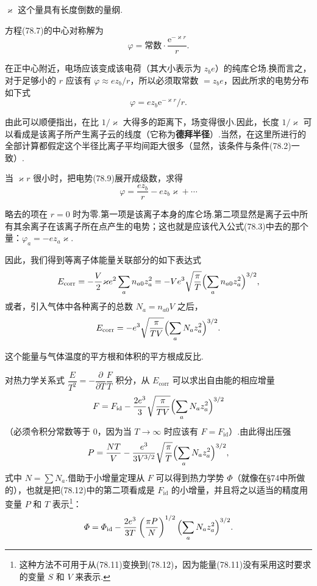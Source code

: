 $\varkappa$ 这个量具有长度倒数的量纲.

方程(78.7)的中心对称解为
\begin{equation*}
  \varphi=\text{常数}\cdot\frac{\mathrm{e}^{-\varkappa r}}{r}.
\end{equation*}

在正中心附近，电场应该变成该电荷（其大小表示为 $z_be$）的纯库仑场.换而言之，对于足够小的 $r$ 应该有 $\varphi\approx ez_b/r$，所以必须取常数 $=z_be$，因此所求的电势分布如下式
\begin{equation}
  \varphi=ez_b\mathrm{e}^{-\varkappa r}/r.
\end{equation}

由此可以顺便指出，在比 $1/\varkappa$ 大得多的距离下，场变得很小.因此，长度 $1/\varkappa$ 可以看成是该离子所产生离子云的线度（它称为\textbf{德拜半径}）.当然，在这里所进行的全部计算都假定这个半径比离子平均间距大很多（显然，该条件与条件(78.2)一致）.

当 $\varkappa r$ 很小时，把电势(78.9)展开成级数，求得
\begin{equation*}
  \varphi=\frac{ez_b}{r}-ez_b\varkappa+\cdots
\end{equation*}

略去的项在 $r=0$ 时为零.第一项是该离子本身的库仑场.第二项显然是离子云中所有其余离子在该离子所在点产生的电势；这也就是应该代入公式(78.3)中去的那个量：$\varphi_a=-ez_a\varkappa$.

因此，我们得到等离子体能量关联部分的如下表达式
\begin{equation}
  E_{\mathrm{corr}}=-\frac{V}{2}\varkappa e^2\sum_an_{a0}z_a^2
  =-Ve^3\sqrt{\frac{\pi}{T}}\Bigl(\sum_an_{a0}z_a^2\Bigr)^{3/2},
\end{equation}
或者，引入气体中各种离子的总数 $N_a=n_{a0}V$ 之后，
\begin{equation}
  E_{\mathrm{corr}}=-e^3\sqrt{\frac{\pi}{TV}}
  \Bigl(\sum_aN_az_a^2\Bigr)^{3/2}.
\end{equation}

这个能量与气体温度的平方根和体积的平方根成反比.

对热力学关系式 $\dfrac{E}{T^2}=-\dfrac{\partial}{\partial T}\dfrac{F}{T}$ 积分，从 $E_{\mathrm{corr}}$ 可以求出自由能的相应增量
\begin{equation}
  F=F_{\mathrm{id}}-\frac{2e^3}{3}\sqrt{\frac{\pi}{TV}}
  \Bigl(\sum_aN_az_a^2\Bigr)^{3/2}
\end{equation}
（必须令积分常数等于 0，因为当 $T\to\infty$ 时应该有 $F=F_{\mathrm{id}}$）.由此得出压强
\begin{equation}
  P=\frac{NT}{V}-\frac{e^3}{3V^{3/2}}\sqrt{\frac{\pi}{T}}
  \Bigl(\sum_aN_az_a^2\Bigr)^{3/2},
\end{equation}
式中 $N=\sum N_a$.借助于小增量定理从 $F$ 可以得到热力学势 $\varPhi$（就像在§74中所做的），也就是把(78.12)中的第二项看成是 $F_{\mathrm{id}}$ 的小增量，并且将之以适当的精度用变量 $P$ 和 $T$ 表示\footnote{这种方法不可用于从(78.11)变换到(78.12)，因为能量(78.11)没有采用这时要求的变量 $S$ 和 $V$ 来表示.}：
\begin{equation}
  \varPhi=\varPhi_{\mathrm{id}}-\frac{2e^3}{3T}\left(\frac{\pi P}{N}\right)^{1/2}
  \Bigl(\sum_aN_az_a^2\Bigr)^{3/2}.
\end{equation}

